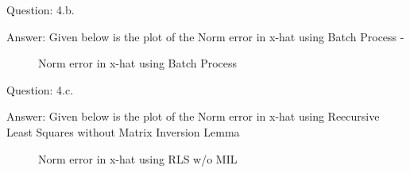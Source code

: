 \documentclass[a4paper]{article}
\begin{document}
\begin{qalist}
		\item[Question: 4.b.] \setcounter{equation}{0}
		\item[Answer:] Given below is the plot of the Norm error in x-hat using Batch Process -
			\begin{figure}[H]			
				\vspace{0.5cm}
				\centering
				\caption{Norm error in x-hat using Batch Process} 
				\label{fig:q4b}
				\vspace{0.5cm}
			\end{figure}
		
		\item[Question: 4.c.] \setcounter{equation}{0}
		\item[Answer:] Given below is the plot of the Norm error in x-hat using Reecursive Least Squares without Matrix Inversion Lemma
			\begin{figure}[H]			
				\vspace{0.5cm}
				\centering
				\caption{Norm error in x-hat using RLS w/o MIL} 
				\label{fig:q4b}
				\vspace{0.5cm}
			\end{figure}
		
		\newpage
		

\end{qalist}
\end{document}
